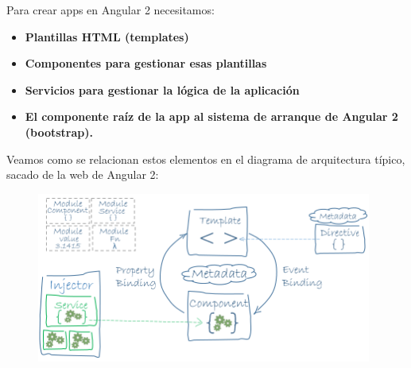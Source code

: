 Para crear apps en Angular 2 necesitamos:

\begin{itemize}

\item \textbf{Plantillas HTML (templates)}
\item \textbf{Componentes para gestionar esas plantillas}
\item \textbf{Servicios para gestionar la lógica de la aplicación}
\item \textbf{El componente raíz de la app al sistema de arranque de Angular 2 (bootstrap).}
\end{itemize}

Veamos como se relacionan estos elementos en el diagrama de arquitectura típico, sacado de la web de Angular 2:

\begin{figure}[H]
    \centering
    \includegraphics[width=110mm]{memoria/LaTeX/img/infraestructura/angular2Architecture.png}
\end{figure}

